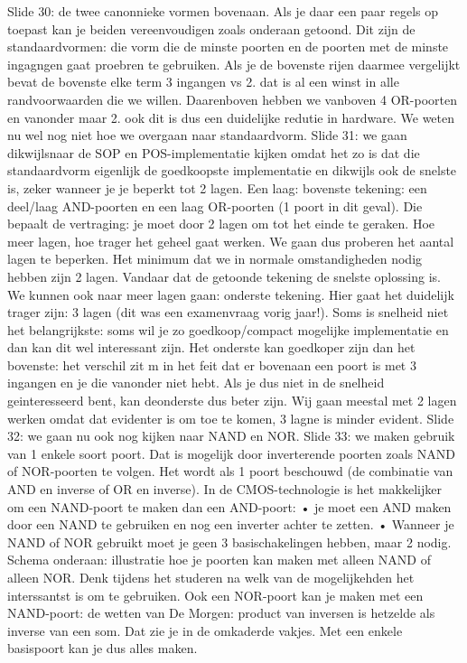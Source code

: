 \documentclass[10pt,a4paper]{book}
\begin{document}
Slide 30: de twee canonnieke vormen bovenaan. Als je daar een paar regels op toepast kan je beiden vereenvoudigen zoals onderaan getoond. Dit zijn de standaardvormen: die vorm die de minste poorten en de poorten met de minste ingagngen gaat proebren te gebruiken. Als je de bovenste rijen daarmee vergelijkt bevat de bovenste elke term 3 ingangen vs 2. dat is al een winst in alle randvoorwaarden die we willen. Daarenboven hebben we vanboven 4 OR-poorten en vanonder maar 2. ook dit is dus een duidelijke redutie in hardware.
We weten nu wel nog niet hoe we overgaan naar standaardvorm.
Slide 31: we gaan dikwijlsnaar de SOP en POS-implementatie kijken omdat het zo is dat die standaardvorm eigenlijk de goedkoopste implementatie en dikwijls ook de snelste is, zeker wanneer je je beperkt tot 2 lagen. Een laag: bovenste tekening: een deel/laag AND-poorten en een laag OR-poorten (1 poort in dit geval). Die bepaalt de vertraging: je moet door 2 lagen om tot het einde te geraken. Hoe meer lagen, hoe trager het geheel gaat werken. We gaan dus proberen het aantal lagen te beperken. Het minimum dat we in normale omstandigheden nodig hebben zijn 2 lagen. Vandaar dat de getoonde tekening de snelste oplossing is.
We kunnen ook naar meer lagen gaan: onderste tekening. Hier gaat het duidelijk trager zijn: 3 lagen (dit was een examenvraag vorig jaar!). Soms is snelheid niet het belangrijkste: soms wil je zo goedkoop/compact mogelijke implementatie en dan kan dit wel interessant zijn. Het onderste kan goedkoper zijn dan het bovenste: het verschil zit m in het feit dat er bovenaan een poort is met 3 ingangen en je die vanonder niet hebt. Als je dus niet in de snelheid geinteresseerd bent, kan deonderste dus beter zijn.
Wij gaan meestal met 2 lagen werken omdat dat evidenter is om toe te komen, 3 lagne is minder evident. 
Slide 32: we gaan nu ook nog kijken naar NAND en NOR.
Slide 33: we maken gebruik van 1 enkele soort poort. Dat is mogelijk door inverterende poorten zoals NAND of NOR-poorten te volgen. Het wordt als 1 poort beschouwd (de combinatie van AND en inverse of OR en inverse). In de CMOS-technologie is het makkelijker om een NAND-poort te maken dan een AND-poort: 
	• je moet een AND maken door een NAND te gebruiken en nog een inverter achter te zetten.
	• Wanneer je NAND of NOR gebruikt moet je geen 3 basischakelingen hebben, maar 2 nodig. Schema onderaan: illustratie hoe je poorten kan maken met alleen NAND of alleen NOR. Denk tijdens het studeren na welk van de mogelijkehden het interssantst is om te gebruiken. 
Ook een NOR-poort kan je maken met een NAND-poort: de wetten van De Morgen: product van inversen is hetzelde als inverse van een som. Dat zie je in de omkaderde vakjes. Met een enkele basispoort kan je dus alles maken.
\end{document}
